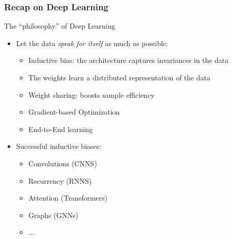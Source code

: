 \documentclass[10pt]{beamer}
\begin{document}
\begin{frame}
  \frametitle{Recap on Deep Learning}
	The ``philosophy'' of Deep Learning
	\vspace{.25cm}
	\begin{itemize}
	\item Let the data \emph{speak for itself} as much as possible:
	\begin{itemize}
	\vspace{.1cm}	\item {\color{blue} Inductive bias}: the architecture captures invariances in the data
	\vspace{.1cm}	\item The weights learn a {\color{blue} distributed representation} of the data
	\vspace{.1cm}	\item {\color{blue} Weight sharing}: boosts sample efficiency
	\vspace{.1cm}	\item {\color{blue} Gradient-based} Optimization
	\vspace{.1cm}	\item {\color{blue} End-to-End} learning
	\end{itemize}
	\vspace{.25cm}
	\item Successful inductive biases:
	\begin{itemize}
	\vspace{.1cm}	\item Convolutions (CNNS)
	\vspace{.1cm}	\item Recurrency (RNNS)
	\vspace{.1cm}	\item Attention (Transformers)
	\vspace{.1cm}	\item Graphs (GNNs)
	\item ...
	\end{itemize}
	\end{itemize}
\end{frame}
\end{document}

